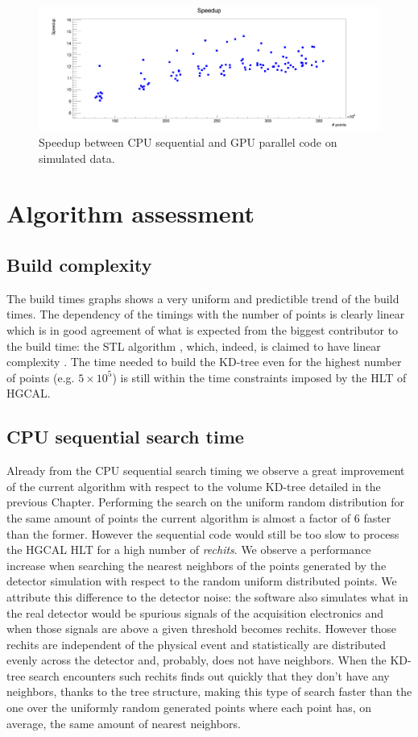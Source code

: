 \begin{figure}
\includegraphics[width=\textwidth]{rechits/Speedup.png}
\caption{Speedup between CPU sequential and GPU parallel code on simulated data.}
\label{fkdtree_speedup}
\end{figure}
\clearpage

\section{Algorithm assessment}
\subsection{Build complexity}
The build times graphs shows a very uniform and predictible trend of the build times. The dependency of the timings with the number of points is clearly linear which is in good agreement of what is expected from the biggest contributor to the build time: the STL algorithm , which, indeed, is claimed to have linear complexity \cite{iso_stl}. The time needed to build the KD-tree even for the highest number of points (e.g. $5 \times 10^5$) is still within the time constraints imposed by the HLT of HGCAL.

\subsection{CPU sequential search time}
Already from the CPU sequential search timing we observe a great improvement of the current algorithm with respect to the volume KD-tree detailed in the previous Chapter. Performing the search on the uniform random distribution for the same amount of points the current algorithm is almost a factor of 6 faster than the former.
However the sequential code would still be too slow to process the HGCAL HLT for a high number of \textit{rechits}. We observe a performance increase when searching the nearest neighbors of the points generated by the detector simulation with respect to the random uniform distributed points. We attribute this difference to the detector noise: the software also simulates what in the real detector would be spurious signals of the acquisition electronics and when those signals are above a given threshold becomes rechits. However those rechits are independent of the physical event and statistically are distributed evenly across the detector and, probably, does not have neighbors. When the KD-tree search encounters such rechits finds out quickly that they don't have any neighbors, thanks to the tree structure, making this type of search faster than the one over the uniformly random generated points where each point has, on average, the same amount of nearest neighbors.

